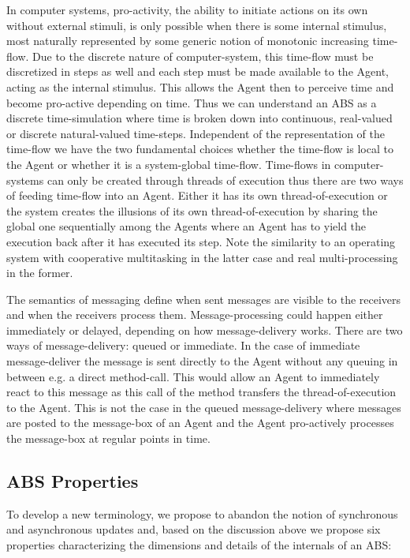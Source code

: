 In computer systems, pro-activity, the ability to initiate actions on its own without external stimuli, is only possible when there is some internal stimulus, most naturally represented by some generic notion of monotonic increasing time-flow. Due to the discrete nature of computer-system, this time-flow must be discretized in steps as well and each step must be made available to the Agent, acting as the internal stimulus. This allows the Agent then to perceive time and become pro-active depending on time. Thus we can understand an ABS as a discrete time-simulation where time is broken down into continuous, real-valued or discrete natural-valued time-steps. Independent of the representation of the time-flow we have the two fundamental choices whether the time-flow is local to the Agent or whether it is a system-global time-flow. Time-flows in computer-systems can only be created through threads of execution thus there are two ways of feeding time-flow into an Agent. Either it has its own thread-of-execution or the system creates the illusions of its own thread-of-execution by sharing the global one sequentially among the Agents where an Agent has to yield the execution back after it has executed its step. Note the similarity to an operating system with cooperative multitasking in the latter case and real multi-processing in the former.

\medskip 

The semantics of messaging define when sent messages are visible to the receivers and when the receivers process them. Message-processing could happen either immediately or delayed, depending on how message-delivery works. There are two ways of message-delivery: queued or immediate. In the case of immediate message-deliver the message is sent directly to the Agent without any queuing in between e.g. a direct method-call. This would allow an Agent to immediately react to this message as this call of the method transfers the thread-of-execution to the Agent. This is not the case in the queued message-delivery where messages are posted to the message-box of an Agent and the Agent pro-actively processes the message-box at regular points in time.

\subsection{ABS Properties}
To develop a new terminology, we propose to abandon the notion of synchronous and asynchronous updates and, based on the discussion above we propose six properties characterizing the dimensions and details of the internals of an ABS:

